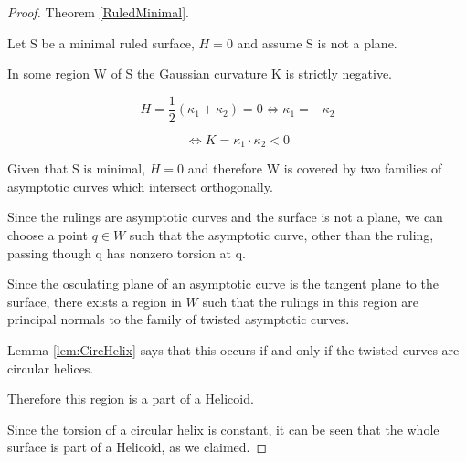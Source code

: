 \begin{proof}{Theorem \ref{RuledMinimal}}. 

Let S be a minimal ruled surface, $H=0$ and assume S is not a plane.

In some region W of S the Gaussian curvature K is strictly negative.

\begin{displaymath}
H =\frac{1}{2} (\kappa_1+\kappa_2) = 0 \Leftrightarrow \kappa_1 = -\kappa_2
\end{displaymath}

\begin{displaymath}
\Leftrightarrow K=\kappa_1 \cdot \kappa_2 < 0
\end{displaymath}

Given that S is minimal, $H=0$ and therefore W is covered by two families of asymptotic curves which intersect orthogonally. 

Since the rulings are asymptotic curves and the surface is not a plane, we can choose a point $q \in W$ such that the asymptotic curve, other than the ruling, passing though q has nonzero torsion at q.

Since the osculating plane of an asymptotic curve is the tangent plane to the surface, there exists a region in $W$ such that the rulings in this region are principal normals to the family of twisted asymptotic curves.

Lemma \ref{lem:CircHelix} says that this occurs if and only if the twisted curves are circular helices.

Therefore this region is a part of a Helicoid.

Since the torsion of a circular helix is constant, it can be seen that the whole surface is part of a Helicoid, as we claimed.
\end{proof}


